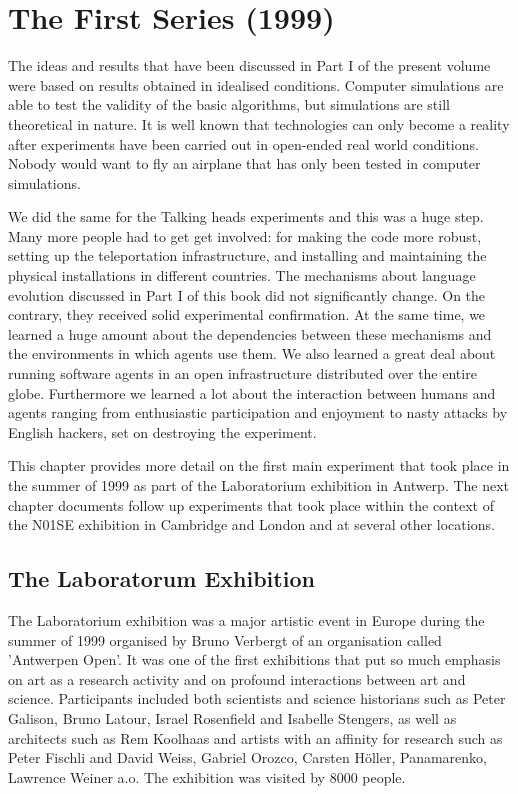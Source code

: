 \chapter{The First Series (1999)}
\label{c:first-series}

The ideas and results that have been discussed in Part I of the present volume 
were based on results obtained in idealised conditions. Computer simulations are able to 
test the validity of the basic algorithms, but simulations are still theoretical in nature. 
It is well known that technologies can only become a reality after 
experiments have been carried out in open-ended real world conditions. Nobody would want to fly an airplane that 
has only been tested in computer simulations. 

We did the same for the Talking heads experiments and this was a huge step. Many more people had to get
get involved: for making the code more robust, setting up the teleportation infrastructure, and installing and 
maintaining the physical installations in different countries.  
The mechanisms about language evolution discussed in Part I of this book did not significantly change. On the contrary, 
they received solid experimental confirmation. At the same time, we learned a huge amount about the dependencies
between these mechanisms and the environments in which agents use them. We also learned a great deal about running software 
agents in an open infrastructure distributed over the entire globe. Furthermore we learned a lot 
about the interaction between humans and agents ranging from 
enthusiastic participation and enjoyment to nasty attacks by English hackers, set on destroying the experiment. 

This chapter provides more detail on the first main experiment that took place in the summer of 1999 as 
part of the Laboratorium exhibition in Antwerp. The next chapter documents follow up experiments that took place
within the context of the N01SE exhibition in Cambridge and London and at several other locations. 

\section{The Laboratorum Exhibition} 

The Laboratorium
exhibition was a major artistic event in Europe during the summer of 1999 organised by 
Bruno Verbergt of an organisation called 'Antwerpen Open'.
It was one of the first exhibitions that put so much emphasis on art as a research 
activity and on profound interactions between art and science.
Participants included both scientists and science historians such as Peter Galison, Bruno Latour, Israel Rosenfield
and Isabelle Stengers, as well as architects such as Rem Koolhaas and artists with an affinity for research 
such as Peter Fischli and David Weiss, Gabriel Orozco, Carsten H\"oller, Panamarenko, Lawrence Weiner a.o. 
The exhibition was visited by 8000 people. 

